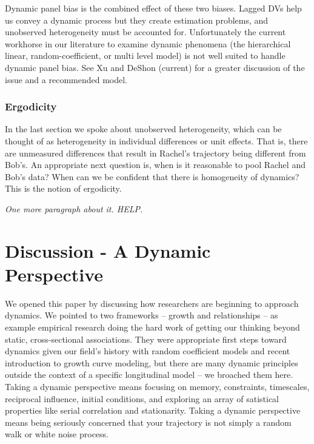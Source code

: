 \documentclass[english,,man]{apa6}
\theoremstyle{definition}
\theoremstyle{definition}
\theoremstyle{definition}
\theoremstyle{remark}
\begin{document}
Dynamic panel bias is the combined effect of these two biases. Lagged
DVs help us convey a dynamic process but they create estimation
problems, and unobserved heterogeneity must be accounted for.
Unfortunately the current workhorse in our literature to examine dynamic
phenomena (the hierarchical linear, random-coefficient, or multi level
model) is not well suited to handle dynamic panel bias. See Xu and
DeShon (current) for a greater discussion of the issue and a recommended
model.

\hypertarget{ergodicity}{%
\subsubsection{Ergodicity}\label{ergodicity}}

In the last section we spoke about unobserved heterogeneity, which can
be thought of as heterogeneity in individual differences or unit
effects. That is, there are unmeasured differences that result in
Rachel's trajectory being different from Bob's. An appropriate next
question is, when is it reasonable to pool Rachel and Bob's data? When
can we be confident that there is homogeneity of dynamics? This is the
notion of ergodicity.

\emph{One more paragraph about it. HELP.}

\hypertarget{discussion---a-dynamic-perspective}{%
\section{Discussion - A Dynamic
Perspective}\label{discussion---a-dynamic-perspective}}

We opened this paper by discussing how researchers are beginning to
approach dynamics. We pointed to two frameworks -- growth and
relationships -- as example empirical research doing the hard work of
getting our thinking beyond static, cross-sectional associations. They
were appropriate first steps toward dynamics given our field's history
with random coefficient models and recent introduction to growth curve
modeling, but there are many dynamic principles outside the context of a
specific longitudinal model -- we broached them here. Taking a dynamic
perspective means focusing on memory, constraints, timescales,
reciprocal influence, initial conditions, and exploring an array of
satistical properties like serial correlation and stationarity. Taking a
dynamic perspective means being seriously concerned that your trajectory
is not simply a random walk or white noise process.
\end{document}

